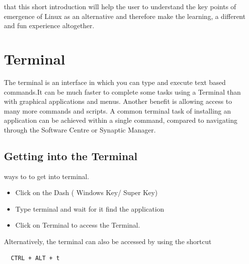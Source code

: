 \documentclass{tufte-book} %
\begin{document}
 that this short introduction will help the user to understand the key points of emergence of Linux as an alternative and therefore make the learning, a different and fun experience altogether.

\section{Terminal}
\begin{fullwidth}
The terminal is an interface in which you can type and execute text based commands.It can be much faster to complete some tasks using a Terminal than with graphical applications and menus. Another benefit is allowing access to many more commands and scripts. A common terminal task of installing an application can be achieved within a single command, compared to navigating through the Software Centre or Synaptic Manager. 
\end{fullwidth}
\subsection{Getting into the Terminal}
 ways to to get into terminal.
\begin{itemize}
\item Click on the Dash ( Windows Key/ Super Key)
\item Type terminal and wait for it find the application
\item Click on Terminal to access the Terminal. 
\end{itemize}

Alternatively, the terminal can also be accessed by using the shortcut
\begin{verbatim}
  CTRL + ALT + t
\end{verbatim}
\end{document}
